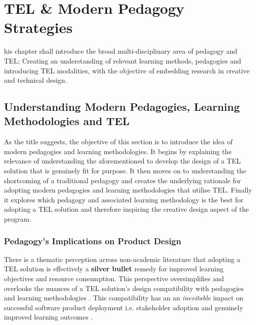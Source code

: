 %
%
\let\textcircled=\pgftextcircled
\chapter{TEL \& Modern Pedagogy Strategies}
\label{chap:TEL and Modern Pedagogical Strategies}


his chapter shall introduce the broad multi-disciplinary area of pedagogy and TEL; Creating an understanding of relevant learning methods, pedagogies and introducing TEL modalities, with the objective of embedding research in creative and technical design.

\section{Understanding Modern Pedagogies, Learning Methodologies and TEL}

As the title suggests, the objective of this section is to introduce the idea of modern pedagogies and learning methodologies. It begins by explaining the relevance of understanding the aforementioned to develop the design of a TEL solution that is genuinely fit for purpose. It then moves on to understanding the shortcoming of  a traditional pedagogy and creates the underlying rationale for adopting modern pedagogies and learning methodologies that utilise TEL. Finally it explores which pedagogy and associated learning methodology is the best for adopting a TEL solution and therefore inspiring the creative design aspect of the program.

\label{sec:sec01}
\subsection{Pedagogy's Implications on Product Design}
\label{subsec:subsec01}

There is a thematic perception across non-academic literature that adopting a TEL solution is effectively a \textbf{silver bullet} remedy for improved learning objectives and resource consumption. This perspective oversimplifies and overlooks the nuances of a TEL solution's design compatibility with pedagogies and learning methodologies \cite{RickReis,Means2009,Team2008,Gordon2014,Burge2011}. This compatibility has an an \textit{inevitable} impact on successful software product deployment i.e. stakeholder adoption \cite{Mahamuni2015} and genuinely improved learning outcomes \cite{RickReis,Means2009,Team2008}.

